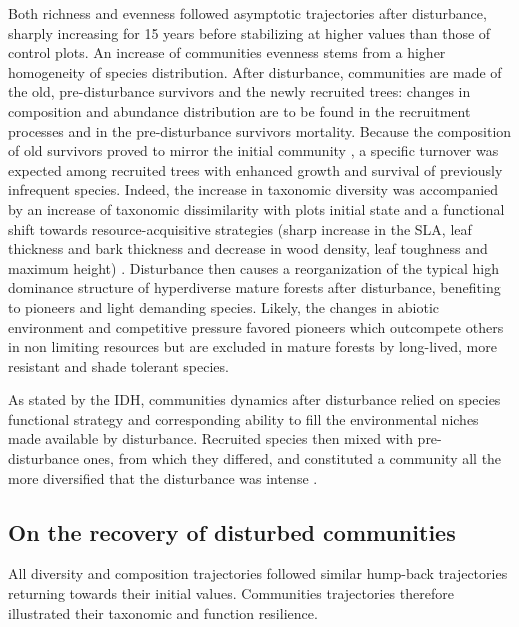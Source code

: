 \documentclass[fleqn,10pt]{ArtEcoFoG} %
\theoremstyle{definition}
\theoremstyle{definition}
\theoremstyle{definition}
\theoremstyle{remark}
\begin{document}
Both richness and evenness followed asymptotic trajectories after
disturbance, sharply increasing for 15 years before stabilizing at
higher values than those of control plots. An increase of communities
evenness stems from a higher homogeneity of species distribution. After
disturbance, communities are made of the old, pre-disturbance survivors
and the newly recruited trees: changes in composition and abundance
distribution are to be found in the recruitment processes and in the
pre-disturbance survivors mortality. Because the composition of old
survivors proved to mirror the initial community \citep{Herault2018}, a
specific turnover was expected among recruited trees with enhanced
growth and survival of previously infrequent species. Indeed, the
increase in taxonomic diversity was accompanied by an increase of
taxonomic dissimilarity with plots initial state and a functional shift
towards resource-acquisitive strategies (sharp increase in the SLA, leaf
thickness and bark thickness and decrease in wood density, leaf
toughness and maximum height)
\citep{Westoby1998, Wright2004, Reich2014}. Disturbance then causes a
reorganization of the typical high dominance structure of hyperdiverse
mature forests after disturbance, benefiting to pioneers and light
demanding species. Likely, the changes in abiotic environment and
competitive pressure favored pioneers which outcompete others in non
limiting resources but are excluded in mature forests by long-lived,
more resistant and shade tolerant species.

As stated by the IDH, communities dynamics after disturbance relied on
species functional strategy and corresponding ability to fill the
environmental niches made available by disturbance. Recruited species
then mixed with pre-disturbance ones, from which they differed, and
constituted a community all the more diversified that the disturbance
was intense \citep{Molino2001}.

\subsection{On the recovery of disturbed
communities}\label{on-the-recovery-of-disturbed-communities}

All diversity and composition trajectories followed similar hump-back
trajectories returning towards their initial values. Communities
trajectories therefore illustrated their taxonomic and function
resilience.
\end{document}
